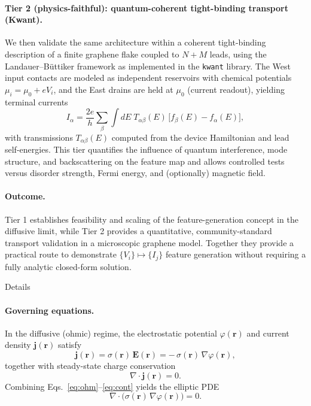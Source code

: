 \documentclass[aps, prb, superscriptaddress, longbibliography]{revtex4-2}
\renewcommand{\phi}{\varphi}
\numberwithin{equation}{section}
\begin{document}
    \paragraph{Tier 2 (physics-faithful): quantum-coherent tight-binding transport (Kwant).}
    We then validate the same architecture within a coherent tight-binding description of a finite graphene flake
    coupled to \(N+M\) leads, using the Landauer--B\"uttiker framework as implemented in the \texttt{kwant} library.
    The West input contacts are modeled as independent reservoirs with chemical potentials
    \(\mu_i=\mu_0+eV_i\), and the East drains are held at \(\mu_0\) (current readout), yielding terminal currents
    \begin{equation}
    I_\alpha
    = \frac{2e}{h}\sum_{\beta}\int dE\;
    T_{\alpha\beta}(E)\,\big[f_\beta(E)-f_\alpha(E)\big],
    \end{equation}
    with transmissions \(T_{\alpha\beta}(E)\) computed from the device Hamiltonian and lead self-energies.
    This tier quantifies the influence of quantum interference, mode structure, and backscattering on the
    feature map and allows controlled tests versus disorder strength, Fermi energy, and (optionally) magnetic field.
    
    \paragraph{Outcome.}
    Tier 1 establishes feasibility and scaling of the feature-generation concept in the diffusive limit,
    while Tier 2 provides a quantitative, community-standard transport validation in a microscopic graphene model.
    Together they provide a practical route to demonstrate \(\{V_i\}\mapsto\{I_j\}\) feature generation without
    requiring a fully analytic closed-form solution.

    Details \paragraph{Governing equations.}
    In the diffusive (ohmic) regime, the electrostatic potential $\phi(\mathbf r)$
    and current density $\mathbf j(\mathbf r)$ satisfy
    \begin{equation}
    \mathbf j(\mathbf r) = \sigma(\mathbf r)\,\mathbf E(\mathbf r)
    = -\,\sigma(\mathbf r)\,\nabla \phi(\mathbf r),
    \label{eq:ohm}
    \end{equation}
    together with steady-state charge conservation
    \begin{equation}
    \nabla\cdot \mathbf j(\mathbf r)=0.
    \label{eq:cont}
    \end{equation}
    Combining Eqs.~\eqref{eq:ohm}--\eqref{eq:cont} yields the elliptic PDE
    \begin{equation}
    \nabla\cdot\!\big(\sigma(\mathbf r)\,\nabla \phi(\mathbf r)\big)=0.
    \label{eq:pde}
    \end{equation}
    
\end{document}
